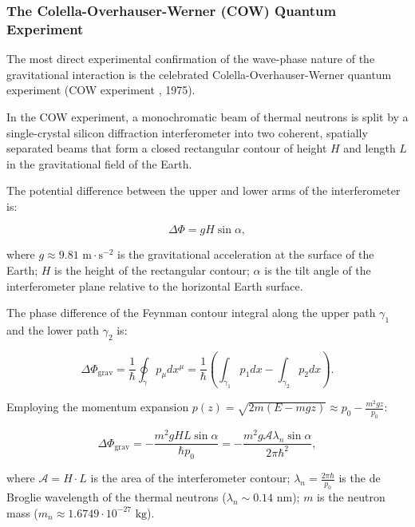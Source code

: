 \subsubsection{The Colella-Overhauser-Werner (COW) Quantum Experiment}\label{sec:2.5.2}

The most direct experimental confirmation of the wave-phase nature of the gravitational interaction is the celebrated Colella-Overhauser-Werner quantum experiment (COW experiment \cite{ref17}, 1975).

In the COW experiment, a monochromatic beam of thermal neutrons is split by a single-crystal silicon diffraction interferometer into two coherent, spatially separated beams that form a closed rectangular contour of height $H$ and length $L$ in the gravitational field of the Earth.

The potential difference between the upper and lower arms of the interferometer is:

\begin{equation}\label{eq:2.52}\label{eq:2.102}\tag{2.52}
\Delta \Phi = g H \sin\alpha,
\end{equation}

where $g \approx 9.81\text{ m}\cdot\text{s}^{-2}$ is the gravitational acceleration at the surface of the Earth;  
$H$ is the height of the rectangular contour;  
$\alpha$ is the tilt angle of the interferometer plane relative to the horizontal Earth surface.

The phase difference of the Feynman contour integral along the upper path $\gamma_1$ and the lower path $\gamma_2$ is:

\begin{equation}\label{eq:2.53}\label{eq:2.103}\tag{2.53}
\Delta \Phi_{\text{grav}} = \frac{1}{\hbar} \oint_\gamma p_\mu dx^\mu = \frac{1}{\hbar} \left( \int_{\gamma_1} p_1 dx - \int_{\gamma_2} p_2 dx \right).
\end{equation}

Employing the momentum expansion $p(z) = \sqrt{2m(E - mgz)} \approx p_0 - \frac{m^2 g z}{p_0}$:

\begin{equation}\label{eq:2.54}\label{eq:2.104}\tag{2.54}
\Delta \Phi_{\text{grav}} = -\frac{m^2 g H L \sin\alpha}{\hbar p_0} = -\frac{m^2 g \mathcal{A} \lambda_n \sin\alpha}{2\pi \hbar^2},
\end{equation}

where $\mathcal{A} = H \cdot L$ is the area of the interferometer contour;  
$\lambda_n = \frac{2\pi \hbar}{p_0}$ is the de Broglie wavelength of the thermal neutrons ($\lambda_n \sim 0.14\text{ nm}$);  
$m$ is the neutron mass ($m_n \approx 1.6749 \cdot 10^{-27}\text{ kg}$).

